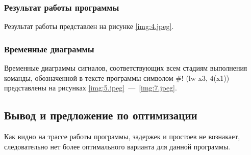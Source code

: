 \subsubsection*{Результат работы программы}
Результат работы представлен на рисунке \ref{img:4.jpeg}.

\subsubsection*{Временные диаграммы}
Временные диаграммы сигналов, соответствующих всем стадиям выполнения команды, обозначенной в тексте программы символом \#! (lw x3, 4(x1)) представлены на рисунках \ref{img:5.jpeg}~---~\ref{img:7.jpeg}.

\subsection*{Вывод и предложение по оптимизации}
Как видно на трассе работы программы, задержек и простоев не вознакает, следовательно нет более оптимального варианта для данной программы.
\clearpage
